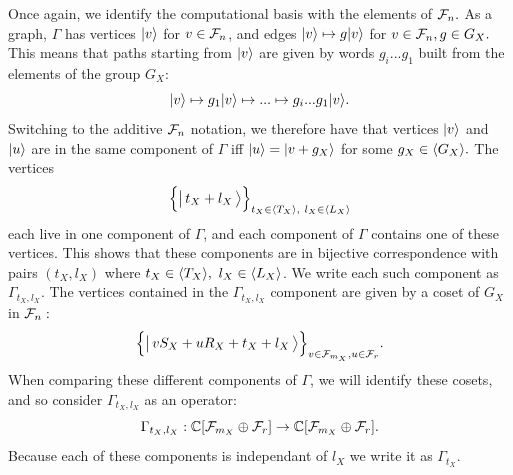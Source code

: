 \doproof
Once again, we identify the computational basis with
the elements of $\mathcal{F}_n.$
As a graph, $\Gamma$ has vertices 
$|{v}\rangle $ for $v\in\mathcal{F}_n$, and edges 
$ |{v}\rangle \mapsto g |{v}\rangle$ for  $v\in\mathcal{F}_{n}, g\in G_X.$
This means that paths starting from $|{v}\rangle$ are given by
words $g_i...g_1$ built from the elements of the group $G_X:$
$$
    |{v}\rangle \mapsto g_1 |{v}\rangle \mapsto ... \mapsto g_i...g_1 |{v}\rangle.
$$
Switching to the additive $\mathcal{F}_n$ notation, we
therefore have that 
vertices $|{v}\rangle$ and $|{u}\rangle$ are in the
same component of $\Gamma$ iff $|{u}\rangle = |{v+g_X}\rangle$ for some $g_X\in\langle G_X \rangle.$
The vertices
$$\Bigl\{ \bigl|\,{t_X + l_X}\,\bigr\rangle \Bigr\}_{t_X\in\langle T_X \rangle,\ l_X\in\langle L_X \rangle}$$
each live in one component of $\Gamma$,
and each component of $\Gamma$ contains one of these vertices.
This shows that these components are in bijective correspondence with
pairs $(t_X, l_X)$ where $t_X\in\Span{T_X},\ l_X\in\Span{L_X}$.
We write each such component as $\Gamma_{t_X,l_X}$.
The vertices contained in the $\Gamma_{t_X,l_X}$ component
are given by a coset of $G_X$ in $\mathcal{F}_{n}:$
$$
    \Bigl\{ \bigl|\,{v S_X + u R_X + t_X + l_X}\,\bigr\rangle \Bigr\}_{v\in \mathcal{F}_{m_X}, u\in\mathcal{F}_{r}}.
$$
When comparing these different components of $\Gamma$, we will
identify these cosets, and so consider $\Gamma_{t_X,l_X}$ as an
operator:
$$
    \Gamma_{t_X,l_X} : \mathbb{C}[\mathcal{F}_{m_X}\oplus\mathcal{F}_r] \to \mathbb{C}[\mathcal{F}_{m_X}\oplus\mathcal{F}_r].
$$
Because each of these components is independant of $l_X$ we write it as $\Gamma_{t_X}.$
\tombstone



